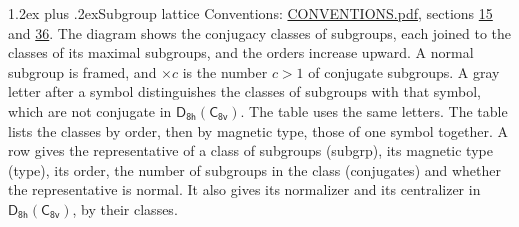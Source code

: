 \documentclass[10pt,a4paper]{article}
\makeatletter
\renewcommand\section{\@startsection{section}{1}{\z@}{-3ex plus -1ex minus -.2ex}%
  {1.2ex plus .2ex}{\normalfont\large\sffamily\bfseries\color{parttitle}}}
\numberwithin{equation}{section}
\newcommand{\grp}[1]{\mathsf{#1}}
\makeatother
\begin{document}
\section{Subgroup lattice}\label{s:subgroups}
Conventions: \href{../../CONVENTIONS.pdf}{CONVENTIONS.pdf}, sections \href{../../../rotation/CONVENTIONS.pdf\#conv.15}{15} and \href{../../CONVENTIONS.pdf\#conv.36}{36}.
The diagram shows the conjugacy classes of subgroups, each joined to the classes of its maximal subgroups, and the orders increase upward. \label{n:index.conjugates.c}\label{n:mark.conjugates}A normal subgroup is framed, and ${\times}c$ is the number $c > 1$ of conjugate subgroups. \label{n:mark.letter}A gray letter after a symbol distinguishes the classes of subgroups with that symbol, which are not conjugate in $\grp{D_{8h}}(\grp{C_{8v}})$. The table uses the same letters. The table lists the classes by order, then by magnetic type, those of one symbol together. \label{n:head.subgroup}\label{n:head.magnetic.type}\label{n:head.order}\label{n:head.conjugates}\label{n:head.normal}A row gives the representative of a class of subgroups (subgrp), its magnetic type (type), its order, the number of subgroups in the class (conjugates) and whether the representative is normal. \label{n:head.normalizer}\label{n:head.centralizer}It also gives its normalizer and its centralizer in $\grp{D_{8h}}(\grp{C_{8v}})$, by their classes. 
\end{document}
